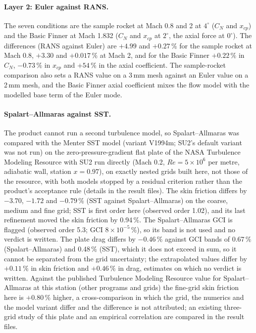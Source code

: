 \documentclass[twocolumn]{labreport}
\begin{document}
\paragraph{Layer 2: Euler against RANS.}
The seven conditions are the sample rocket at Mach 0.8 and 2 at $4^\circ$ ($C_N$ and $x_{cp}$) and the Basic Finner at Mach 1.832 ($C_N$ and $x_{cp}$ at $2^\circ$, the axial force at $0^\circ$).
The differences (RANS against Euler) are $+4.99$ and $+0.27\,\%$ for the sample rocket at Mach 0.8, $+3.30$ and $+0.017\,\%$ at Mach 2, and for the Basic Finner $+0.22\,\%$ in $C_N$, $-0.73\,\%$ in $x_{cp}$ and $+54\,\%$ in the axial coefficient.
The sample-rocket comparison also sets a RANS value on a 3\,mm mesh against an Euler value on a 2\,mm mesh, and the Basic Finner axial coefficient mixes the flow model with the modelled base term of the Euler mode.

\paragraph{Spalart--Allmaras against SST.}
\label{sec:model}
The product cannot run a second turbulence model, so Spalart--Allmaras was compared with the Menter SST model (variant V1994m; SU2's default variant was not run) on the zero-pressure-gradient flat plate of the NASA Turbulence Modeling Resource \citep{tmr} with SU2 run directly (Mach 0.2, $Re=5\times10^{6}$ per metre, adiabatic wall, station $x=0.97$), on exactly nested grids built here, not those of the resource, with both models stopped by a residual criterion rather than the product's acceptance rule (details in the result files).
The skin friction differs by $-3.70$, $-1.72$ and $-0.79\,\%$ (SST against Spalart--Allmaras) on the coarse, medium and fine grid; SST is first order here (observed order 1.02), and its last refinement moved the skin friction by 0.94\,\%.
The Spalart--Allmaras GCI is flagged (observed order 5.3; GCI $8\times10^{-5}\,\%$), so its band is not used and no verdict is written.
The plate drag differs by $-0.46\,\%$ against GCI bands of 0.67\,\% (Spalart--Allmaras) and 0.48\,\% (SST), which it does not exceed in sum, so it cannot be separated from the grid uncertainty; the extrapolated values differ by $+0.11\,\%$ in skin friction and $+0.46\,\%$ in drag, estimates on which no verdict is written.
Against the published Turbulence Modeling Resource value for Spalart--Allmaras at this station (other programs and grids) the fine-grid skin friction here is $+0.80\,\%$ higher, a cross-comparison in which the grid, the numerics and the model variant differ and the difference is not attributed; an existing three-grid study of this plate and an empirical correlation are compared in the result files.
\end{document}
